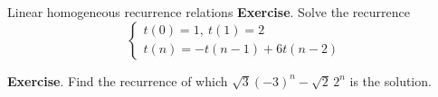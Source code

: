 \documentclass{beamer}
\begin{document}
%

\begin{frame}{Linear homogeneous recurrence relations}
	\textbf{Exercise}. Solve the recurrence
	\begin{displaymath}
		\begin{cases}
			t(0)= 1,\ t(1)= 2\\
			t(n)= -t(n-1) + 6t(n-2)
		\end{cases}
	\end{displaymath}\pause

	\textbf{Exercise}. Find the recurrence of which $\sqrt{3}(-3)^n - \sqrt{2}\, 2^n$
	is the solution.
\end{frame}
\end{document}
